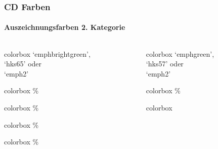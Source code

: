\documentclass[german,notoc]{tudbeamer}%
\begin{document}
\begin{frame}
	\frametitle{CD Farben}
	\framesubtitle{Auszeichnungsfarben 2. Kategorie}

	\begin{columns}[T,onlytextwidth]
		\begin{column}{.19\textwidth}%
			\begin{beamercolorbox}[wd=0.9\textwidth,sep=1em]{colorbox}
				\centering `emphbrightgreen',\\ `hks65' oder\\ `emph2'
		    \end{beamercolorbox}
			\begin{beamercolorbox}[wd=0.9\textwidth,sep=1em]{colorbox}
				\%
		    \end{beamercolorbox}
			\begin{beamercolorbox}[wd=0.9\textwidth,sep=1em]{colorbox}
				\%
		    \end{beamercolorbox}
			\begin{beamercolorbox}[wd=0.9\textwidth,sep=1em]{colorbox}
				\%
		    \end{beamercolorbox}
			\begin{beamercolorbox}[wd=0.9\textwidth,sep=1em]{colorbox}
				\%
		    \end{beamercolorbox}
		\end{column}
		\begin{column}{.19\textwidth}%
			\begin{beamercolorbox}[wd=0.9\textwidth,sep=1em]{colorbox}
				\centering `emphgreen',\\ `hks57' oder\\ `emph2'
		    \end{beamercolorbox}
			\begin{beamercolorbox}[wd=0.9\textwidth,sep=1em]{colorbox}
				\%
		    \end{beamercolorbox}
			\begin{beamercolorbox}[wd=0.9\textwidth,sep=1em]{colorbox}

\end{beamercolorbox}
\end{column}
\end{columns}
\end{frame}
\end{document}
